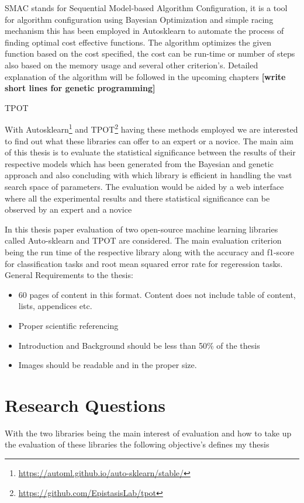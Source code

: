 SMAC\cite{smac-2017} stands for Sequential Model-based Algorithm Configuration, it is a tool for algorithm configuration using Bayesian Optimization and simple racing mechanism this has been employed in Autosklearn\cite{autosklearn} to automate the process of finding optimal cost effective functions. The algorithm optimizes the given function based on the cost specified, the cost can be run-time or number of steps also based on the memory usage and several other criterion's. Detailed explanation of the algorithm will be followed in the upcoming chapters \textbf{[write short lines for genetic programming]}

TPOT




With Autosklearn\footnote{\url{https://automl.github.io/auto-sklearn/stable/}} and TPOT\footnote{\url{https://github.com/EpistasisLab/tpot}} having these methods employed we are interested to find out what these libraries can offer to an expert or a novice. The main aim of this thesis is to evaluate the statistical significance between the results of their respective models which has been generated from the Bayesian and genetic approach and also concluding with which library is efficient in handling the vast search space of parameters. The evaluation would be aided by a web interface where all the experimental results and there statistical significance can be observed by an expert and a novice



In this thesis paper evaluation of  two open-source machine learning libraries called Auto-sklearn\cite{autosklearn} and TPOT\cite{tpot} are considered. The main evaluation criterion being the run time of the respective library along with the accuracy and f1-score for classification tasks and root mean squared error rate for regeression tasks. 
General Requirements to the thesis:

\begin{itemize}
	\item 60 pages of content in this format. Content does not include table of content, lists, appendices etc.
	\item Proper scientific referencing
	\item Introduction and Background should be less than 50\% of the thesis
	\item Images should be readable and in the proper size. 
\end{itemize}


\section{Research Questions}
With the two libraries being the main interest of evaluation and how to take up the evaluation of these libraries the following objective's defines my thesis


